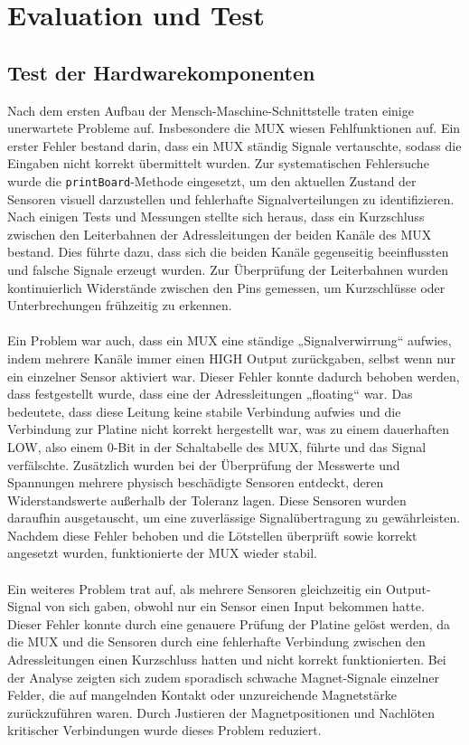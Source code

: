 \documentclass[a4paper]{article}
\begin{document}
\section{Evaluation und Test}
\label{sec:evaluation}
\subsection{Test der Hardwarekomponenten}
\label{sec:fehleranalyse}
Nach dem ersten Aufbau der Mensch-Maschine-Schnittstelle traten einige unerwartete Probleme auf. Insbesondere die MUX wiesen Fehlfunktionen auf. Ein erster Fehler bestand darin, dass ein MUX ständig Signale vertauschte, sodass die Eingaben nicht korrekt übermittelt wurden. Zur systematischen Fehlersuche wurde die \texttt{printBoard}-Methode eingesetzt, um den aktuellen Zustand der Sensoren visuell darzustellen und fehlerhafte Signalverteilungen zu identifizieren. Nach einigen Tests und Messungen stellte sich heraus, dass ein Kurzschluss zwischen den Leiterbahnen der Adressleitungen der beiden Kanäle des MUX bestand. Dies führte dazu, dass sich die beiden Kanäle gegenseitig beeinflussten und falsche Signale erzeugt wurden. Zur Überprüfung der Leiterbahnen wurden kontinuierlich Widerstände zwischen den Pins gemessen, um Kurzschlüsse oder Unterbrechungen frühzeitig zu erkennen.\\
\\
Ein Problem war auch, dass ein MUX eine ständige „Signalverwirrung“ aufwies, indem mehrere Kanäle immer einen HIGH Output zurückgaben, selbst wenn nur ein einzelner Sensor aktiviert war. Dieser Fehler konnte dadurch behoben werden, dass festgestellt wurde, dass eine der Adressleitungen „floating“ war. Das bedeutete, dass diese Leitung keine stabile Verbindung aufwies und die Verbindung zur Platine nicht korrekt hergestellt war, was zu einem dauerhaften LOW, also einem 0-Bit in der Schaltabelle des MUX, führte und das Signal verfälschte. Zusätzlich wurden bei der Überprüfung der Messwerte und Spannungen mehrere physisch beschädigte Sensoren entdeckt, deren Widerstandswerte außerhalb der Toleranz lagen. Diese Sensoren wurden daraufhin ausgetauscht, um eine zuverlässige Signalübertragung zu gewährleisten. Nachdem diese Fehler behoben und die Lötstellen überprüft sowie korrekt angesetzt wurden, funktionierte der MUX wieder stabil.\\
\\
Ein weiteres Problem trat auf, als mehrere Sensoren gleichzeitig ein Output-Signal von sich gaben, obwohl nur ein Sensor einen Input bekommen hatte. Dieser Fehler konnte durch eine genauere Prüfung der Platine gelöst werden, da die MUX und die Sensoren durch eine fehlerhafte Verbindung zwischen den Adressleitungen einen Kurzschluss hatten und nicht korrekt funktionierten. Bei der Analyse zeigten sich zudem sporadisch schwache Magnet-Signale einzelner Felder, die auf mangelnden Kontakt oder unzureichende Magnetstärke zurückzuführen waren. Durch Justieren der Magnetpositionen und Nachlöten kritischer Verbindungen wurde dieses Problem reduziert.\\
\\
\end{document}
